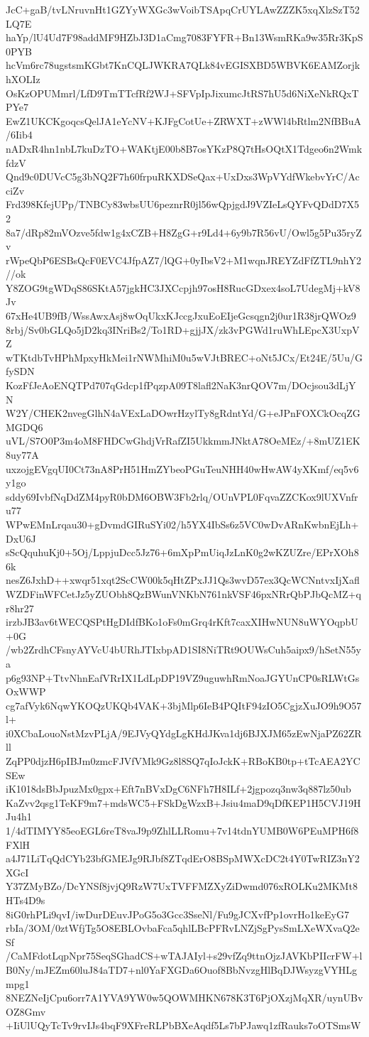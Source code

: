 JcC+gaB/tvLNruvnHt1GZYyWXGc3wVoibTSApqCrUYLAwZZZK5xqXlzSzT52LQ7E
haYp/lU4Ud7F98addMF9HZbJ3D1aCmg7083FYFR+Bn13WsmRKa9w35Rr3KpS0PYB
hcVm6rc78ugstsmKGbt7KnCQLJWKRA7QLk84vEGISXBD5WBVK6EAMZorjkhXOLIz
OsKzOPUMmrl/LfD9TmTTcfRf2WJ+SFVpIpJixumcJtRS7hU5d6NiXeNkRQxTPYe7
EwZ1UKCKgoqcsQelJA1eYcNV+KJFgCotUe+ZRWXT+zWWl4bRtlm2NfBBuA/6Iib4
nADxR4hn1nbL7kuDzTO+WAKtjE00b8B7osYKzP8Q7tHsOQtX1Tdgeo6n2WmkfdzV
Qnd9c0DUVcC5g3bNQ2F7h60frpuRKXDSeQax+UxDxs3WpVYdfWkebvYrC/AcciZv
Frd398KfejUPp/TNBCy83wbsUU6peznrR0jl56wQpjgdJ9VZIeLsQYFvQDdD7X52
8a7/dRp82mVOzve5fdw1g4xCZB+H8ZgG+r9Ld4+6y9b7R56vU/Owl5g5Pu35ryZv
rWpeQbP6ESBsQcF0EVC4JfpAZ7/lQG+0yIbsV2+M1wqnJREYZdFfZTL9nhY2//ok
Y8ZOG9tgWDqS86SKtA57jgkHC3JXCcpjh97osH8RucGDxex4soL7UdegMj+kV8Jv
67xHe4UB9fB/WssAwxAsj8wOqUkxKJccgJxuEoEIjeGcsqgn2j0ur1R38jrQWOz9
8rbj/Sv0bGLQo5jD2kq3INriBs2/To1RD+gjjJX/zk3vPGWd1ruWhLEpcX3UxpVZ
wTKtdbTvHPhMpxyHkMei1rNWMhiM0u5wVJtBREC+oNt5JCx/Et24E/5Uu/GfySDN
KozFfJeAoENQTPd707qGdcp1fPqzpA09T8lafl2NaK3nrQOV7m/DOcjsou3dLjYN
W2Y/CHEK2nvegGlhN4aVExLaDOwrHzylTy8gRdntYd/G+eJPnFOXCkOcqZGMGDQ6
uVL/S7O0P3m4oM8FHDCwGhdjVrRafZI5UkkmmJNktA78OeMEz/+8mUZ1EK8uy77A
uxzojgEVgqUI0Ct73nA8PrH51HmZYbeoPGuTeuNHH40wHwAW4yXKmf/eq5v6y1go
sddy69IvbfNqDdZM4pyR0bDM6OBW3Fb2rlq/OUnVPL0FqvaZZCKox9lUXVnfru77
WPwEMnLrqau30+gDvmdGIRuSYi02/h5YX4IbSs6z5VC0wDvARnKwbnEjLh+DxU6J
sScQquhuKj0+5Oj/LppjuDcc5Jz76+6mXpPmUiqJzLnK0g2wKZUZre/EPrXOh86k
nesZ6JxhD++xwqr51xqt2ScCW00k5qHtZPxJJ1Qs3wvD57ex3QcWCNntvxIjXafl
WZDFinWFCetJz5yZUObh8QzBWunVNKbN761nkVSF46pxNRrQbPJbQcMZ+qr8hr27
irzbJB3av6tWECQSPtHgDIdfBKo1oFs0mGrq4rKft7caxXIHwNUN8uWYOqpbU+0G
/wb2ZrdhCFsnyAYVcU4bURhJTIxbpAD1SI8NiTRt9OUWsCuh5aipx9/hSetN55ya
p6g93NP+TtvNhnEafVRrIX1LdLpDP19VZ9uguwhRmNoaJGYUnCP0sRLWtGsOxWWP
cg7afVyk6NqwYKOQzUKQb4VAK+3bjMlp6IeB4PQItF94zIO5CgjzXuJO9h9O57l+
i0XCbaLouoNstMzvPLjA/9EJVyQYdgLgKHdJKva1dj6BJXJM65zEwNjaPZ62ZRll
ZqPP0djzH6pIBJm0zmcFJVfVMk9Gz8l8SQ7qIoJckK+RBoKB0tp+tTcAEA2YCSEw
iK1018dsBbJpuzMx0gpx+Eft7nBVxDgC6NFh7H8ILf+2jgpozq3nw3q887lz50ub
KaZvv2qsg1TeKF9m7+mdsWC5+FSkDgWzxB+Jsiu4maD9qDfKEP1H5CVJ19HJu4h1
1/4dTIMYY85eoEGL6reT8vaJ9p9ZhlLLRomu+7v14tdnYUMB0W6PEuMPH6f8FXlH
a4J71LiTqQdCYb23bfGMEJg9RJbf8ZTqdErO8BSpMWXcDC2t4Y0TwRIZ3nY2XGcI
Y37ZMyBZo/DcYNSf8jvjQ9RzW7UxTVFFMZXyZiDwmd076xROLKu2MKMt8HTs4D9s
8iG0rhPLi9qvI/iwDurDEuvJPoG5o3Gcc3SseNl/Fu9gJCXvfPp1ovrHo1keEyG7
rbIa/3OM/0ztWfjTg5O8EBLOvbaFca5qhlLBcPFRvLNZjSgPysSmLXeWXvaQ2eSf
/CaMFdotLqpNpr75SeqSGhadCS+wTAJAIyl+s29vfZq9ttnOjzJAVKbPIIcrFW+l
B0Ny/mJEZm60luJ84aTD7+nl0YaFXGDa6Ouof8BbNvzgHlBqDJWsyzgVYHLgmpg1
8NEZNeIjCpu6orr7A1YVA9YW0w5QOWMHKN678K3T6PjOXzjMqXR/uynUBvOZ8Gmv
+IiUlUQyTcTv9rvIJs4bqF9XFreRLPbBXeAqdf5Ls7bPJawq1zfRauks7oOTSmsW
